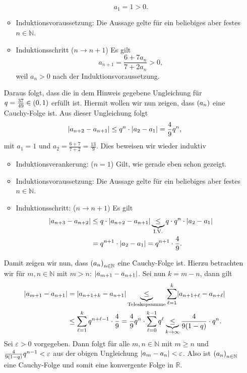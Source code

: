 \documentclass[german,12pt]{homework}
\newcommand{\NN}{\mathbb{N}}
\newcommand{\RR}{\mathbb{R}}
\DeclarePairedDelimiter{\absolute}{\lvert}{\rvert}
\DeclarePairedDelimiter{\enbrace}{(}{)}
\begin{document}
\begin{enumerate}
\begin{itemize}
            \[a_1 = 1 > 0.\]
            \item Induktionsvoraussetzung: Die Aussage gelte für ein beliebiges aber festes \(n \in \NN\).
            \item Induktionsschritt (\(n \to n + 1\)) Es gilt
            \[a_{n + 1} = \frac{6 + 7a_n}{7 + 2a_n} > 0,\]
            weil \(a_n > 0\) nach der Induktionsvoraussetzung.
        \end{itemize}
        Daraus folgt, dass die in dem Hinweis gegebene Ungleichung für \(q = \frac{37}{49} \in \enbrace{0, 1}\) erfüllt ist. Hiermit wollen wir nun zeigen, dass \(\enbrace*{a_n}\)  eine Cauchy-Folge ist. Aus dieser Ungleichung folgt
        \[\absolute*{a_{n + 2} - a_{n + 1}} \le q^n \cdot \absolute*{a_2 - a_1} = \frac{4}{9}q^n,\]
        mit \(a_1 = 1\) und \(a_2 = \frac{6 + 7}{7 + 2} = \frac{13}{9}\). Dies beweisen wir wieder induktiv
        \begin{itemize}
            \item Induktionsverankerung: (\(n = 1\)) Gilt, wie gerade eben schon gezeigt.
            \item Induktionsvoraussetzung: Die Aussage gelte für ein beliebiges aber festes \(n \in \NN\).
            \item Induktionsschritt: (\(n \to n + 1\)) Es gilt
            \begin{align*}
                \absolute*{a_{n + 3} - a_{n + 2}} &\le q \cdot \absolute*{a_{n + 2} - a_{n + 1}} \underbrace{\le}_\text{I.V.} q \cdot q^n \cdot \absolute*{a_2 - a_1}\\
                & = q^{n + 1} \cdot \absolute*{a_2 - a_1} = q^{n + 1} \cdot \frac{4}{9}.
            \end{align*}
        \end{itemize}
        Damit zeigen wir nun, dass \(\enbrace*{a_n}_{n \in \NN}\) eine Cauchy-Folge ist. Hierzu betrachten wir für \(m, n \in \NN\) mit \(m > n\): \(\absolute*{a_{m + 1} - a_{n + 1}}\). Sei nun \(k = m - n\), dann gilt
        \begin{align*}
            \absolute*{a_{m + 1} - a_{n + 1}} &= \absolute*{a_{n + 1 + k} - a_{n + 1}} \underbrace{\le}_\text{Teleskopsumme}\sum_{\ell = 1}^k\absolute*{a_{n + 1 + \ell} - a_{n + \ell}}\\
            &\le \sum_{\ell = 1}^kq^{n + \ell - 1} \cdot \frac{4}{9} = \frac{4}{9}q^n \cdot \sum_{\ell = 0}^{k - 1}q^\ell \underbrace{\le}_{k \to \infty} \frac{4}{9\enbrace*{1 - q}} \cdot q^n.
        \end{align*}
        Sei \(\varepsilon > 0\) vorgegeben. Dann folgt für alle \(m, n \in \NN\) mit \(m \ge n\) und \(\frac{4}{9\enbrace*{1 - q}}q^{n - 1} < \varepsilon\) aus der obigen Ungleichung \(\absolute*{a_m - a_n} < \varepsilon\). Also ist \(\enbrace*{a_n}_{n \in \NN}\) eine Cauchy-Folge und somit eine konvergente Folge in \(\RR\).


\end{enumerate}
\end{document}
